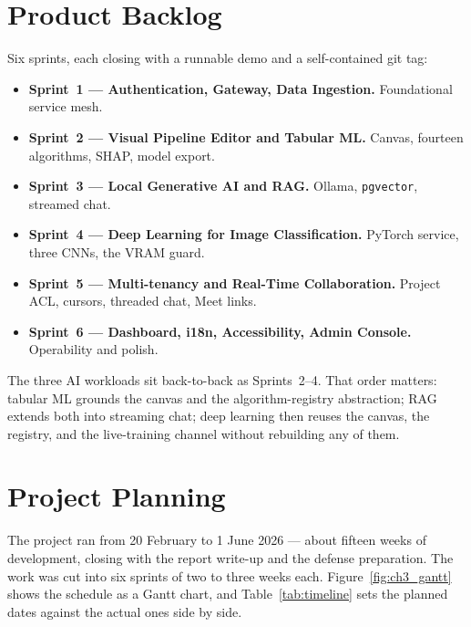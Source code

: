 \documentclass[12pt, a4paper, oneside]{report}
\begin{document}
\section{Product Backlog}

Six sprints, each closing with a runnable demo and a self-contained
git tag:

\begin{itemize}
    \item \textbf{Sprint~1 --- Authentication, Gateway, Data
        Ingestion.} Foundational service mesh.
    \item \textbf{Sprint~2 --- Visual Pipeline Editor and Tabular
        ML.} Canvas, fourteen algorithms, SHAP, model export.
    \item \textbf{Sprint~3 --- Local Generative AI and RAG.} Ollama,
        \texttt{pgvector}, streamed chat.
    \item \textbf{Sprint~4 --- Deep Learning for Image
        Classification.} PyTorch service, three CNNs, the VRAM
        guard.
    \item \textbf{Sprint~5 --- Multi-tenancy and Real-Time
        Collaboration.} Project ACL, cursors, threaded chat, Meet
        links.
    \item \textbf{Sprint~6 --- Dashboard, i18n, Accessibility, Admin
        Console.} Operability and polish.
\end{itemize}

The three AI workloads sit back-to-back as Sprints~2--4. That order
matters: tabular ML grounds the canvas and the algorithm-registry
abstraction; RAG extends both into streaming chat; deep learning then
reuses the canvas, the registry, and the live-training channel
without rebuilding any of them.

\section{Project Planning}

The project ran from 20 February to 1 June 2026 --- about fifteen
weeks of development, closing with the report write-up and the defense
preparation. The work was cut into six sprints of two to three weeks
each. Figure~\ref{fig:ch3_gantt} shows the schedule as a Gantt chart,
and Table~\ref{tab:timeline} sets the planned dates against the actual
ones side by side.
\end{document}
